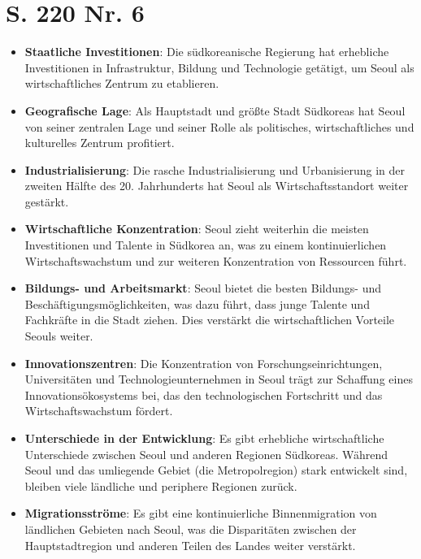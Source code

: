 \documentclass[12pt,a4paper]{report}
\begin{document}
	\section{S. 220 Nr. 6}
	\begin{itemize}
   	\item \textbf{Staatliche Investitionen}: Die südkoreanische Regierung hat erhebliche Investitionen in Infrastruktur, Bildung und Technologie getätigt, um Seoul als wirtschaftliches Zentrum zu etablieren.
   	\item \textbf{Geografische Lage}: Als Hauptstadt und größte Stadt Südkoreas hat Seoul von seiner zentralen Lage und seiner Rolle als politisches, wirtschaftliches und kulturelles Zentrum profitiert.
   	\item \textbf{Industrialisierung}: Die rasche Industrialisierung und Urbanisierung in der zweiten Hälfte des 20. Jahrhunderts hat Seoul als Wirtschaftsstandort weiter gestärkt.
	\end{itemize}

	
	\begin{itemize}
	   \item \textbf{Wirtschaftliche Konzentration}: Seoul zieht weiterhin die meisten Investitionen und Talente in Südkorea an, was zu einem kontinuierlichen Wirtschaftswachstum und zur weiteren Konzentration von Ressourcen führt.
   	\item \textbf{Bildungs- und Arbeitsmarkt}: Seoul bietet die besten Bildungs- und Beschäftigungsmöglichkeiten, was dazu führt, dass junge Talente und Fachkräfte in die Stadt ziehen. Dies verstärkt die wirtschaftlichen Vorteile Seouls weiter.
   	\item \textbf{Innovationszentren}: Die Konzentration von Forschungseinrichtungen, Universitäten und Technologieunternehmen in Seoul trägt zur Schaffung eines Innovationsökosystems bei, das den technologischen Fortschritt und das Wirtschaftswachstum fördert.
	\end{itemize}
	
	
	\begin{itemize}
   	\item \textbf{Unterschiede in der Entwicklung}: Es gibt erhebliche wirtschaftliche Unterschiede zwischen Seoul und anderen Regionen Südkoreas. Während Seoul und das umliegende Gebiet (die Metropolregion) stark entwickelt sind, bleiben viele ländliche und periphere Regionen zurück.
   	\item \textbf{Migrationsströme}: Es gibt eine kontinuierliche Binnenmigration von ländlichen Gebieten nach Seoul, was die Disparitäten zwischen der Hauptstadtregion und anderen Teilen des Landes weiter verstärkt.
	\end{itemize}
	
\end{document}
